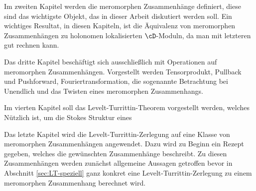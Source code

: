 Im zweiten Kapitel werden die meromorphen Zusammenhänge definiert, diese sind
das wichtigste Objekt, das in dieser Arbeit diskutiert werden soll.
Ein wichtiges Resultat, in diesen Kapiteln, ist die Äquivalenz von meromorphen
Zusammenhängen zu holonomen lokalisierten $\cD$-Moduln, da man mit letzteren
gut rechnen kann.

Das dritte Kapitel beschäftigt sich ausschließlich mit Operationen auf
meromorphen Zusammenhängen.
Vorgestellt werden Tensorprodukt, Pullback und Pushforward,
Fouriertransformation, die sogenannte Betrachtung bei Unendlich und das Twisten
eines meromorphen Zusammenhangs.

Im vierten Kapitel soll das Levelt-Turrittin-Theorem vorgestellt werden, 
welches Nützlich ist, um die Stokes Struktur eines 

\begin{comment}
Die Levelt-Turrittin-Theorem ist eine sogenannte Slope-Filtration. Diese
Klasse, der Slope-Filtrationen wird in \cite{0812.3921} betrachtet.
\end{comment}

Das letzte Kapitel wird die Levelt-Turrittin-Zerlegung auf eine Klasse von
meromorphen Zusammenhängen angewendet. Dazu wird zu Beginn ein Rezept gegeben,
welches die gewünschten Zusammenhänge beschreibt. Zu diesen Zusammenhängen
werden zunächst allgemeine Aussagen getroffen bevor in Abschnitt
\ref{sec:LT-speziell} ganz konkret eine Levelt-Turrittin-Zerlegung zu einem
meromorphen Zusammenhang berechnet wird.

\begin{comment}
Ich möchte diesen Zeitpunkt nutzen, um Herrn Prof. Dr. Hien dafür zu danken,
das er mir ermöglicht hat, mich mit diesem Thema zu beschäftigen.
Auch bedanke ich mich für die hervorragende Betreuung, welche diese Arbeit erst
ermöglicht hat.
\end{comment}

